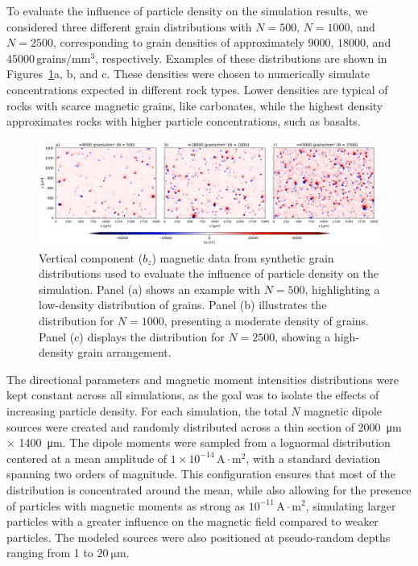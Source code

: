 To evaluate the influence of particle density on the simulation results, we considered three different grain distributions with \(N = 500\), \(N = 1000\), and \(N = 2500\), corresponding to grain densities of approximately \(9000\), \(18000\), and \(45000\,\mathrm{grains/mm^3}\), respectively. Examples of these distributions are shown in Figures~\ref{synthetic-data-maps}a, b, and c. These densities were chosen to numerically simulate concentrations expected in different rock types. Lower densities are typical of rocks with scarce magnetic grains, like carbonates, while the highest density approximates rocks with higher particle concentrations, such as basalts.

\begin{figure}[tb!]
  \centering
  \includegraphics[width=1.0\linewidth]{paper/figures/synthetic-different-densities-maps.png}
  \caption{
Vertical component (\(b_z\)) magnetic data from synthetic grain distributions used to evaluate the influence of particle density on the simulation. Panel (a) shows an example with \(N = 500\), highlighting a low-density distribution of grains. Panel (b) illustrates the distribution for \(N = 1000\), presenting a moderate density of grains. Panel (c) displays the distribution for \(N = 2500\), showing a high-density grain arrangement.
  }
  \label{synthetic-data-maps}
\end{figure}


The directional parameters and magnetic moment intensities distributions were kept constant across all simulations, as the goal was to isolate the effects of increasing particle density. For each simulation, the total \(N\) magnetic dipole sources were created and randomly distributed across a thin section of \qty{2000}{\um} \(\times\) \qty{1400}{\um}. The dipole moments were sampled from a lognormal distribution centered at a mean amplitude of \(1 \times 10^{-14}\,\mathrm{A \cdot m^2}\), with a standard deviation spanning two orders of magnitude. This configuration ensures that most of the distribution is concentrated around the mean, while also allowing for the presence of particles with magnetic moments as strong as \(10^{-11}\,\mathrm{A \cdot m^2}\), simulating larger particles with a greater influence on the magnetic field compared to weaker particles. The modeled sources were also positioned at pseudo-random depths ranging from 1 to \(\qty{20}{\micro\meter}\).


